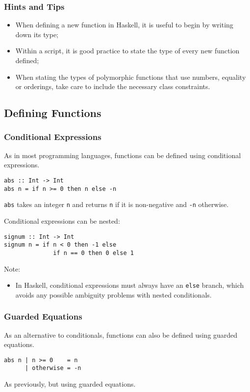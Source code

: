 \begin{multicols}{2}
\subsubsection{Hints and Tips}
\begin{itemize}
  \item When defining a new function in Haskell, it is useful to begin by writing down its type;
  \item Within a script, it is good practice to state the type of every new function defined;
  \item When stating the types of polymorphic functions that use numbers, equality or orderings, take care to include the necessary class constraints.
\end{itemize}

\subsection{Defining Functions}
\subsubsection{Conditional Expressions}
As in most programming languages, functions can be defined using conditional expressions.
\begin{lstlisting}
abs :: Int -> Int
abs n = if n >= 0 then n else -n
\end{lstlisting} %
\lstinline{abs} takes an integer \lstinline{n} and returns \lstinline{n} if it is non-negative and \lstinline{-n} otherwise.

Conditional expressions can be nested:
\begin{lstlisting}
signum :: Int -> Int
signum n = if n < 0 then -1 else
              if n == 0 then 0 else 1
\end{lstlisting}

Note:
\begin{itemize}
  \item In Haskell, conditional expressions must always have an \lstinline{else} branch, which avoids any possible ambiguity problems with nested conditionals.
\end{itemize}

\subsubsection{Guarded Equations}
As an alternative to conditionals, functions can also be defined using guarded equations.
\begin{lstlisting}
abs n | n >= 0    = n
      | otherwise = -n
\end{lstlisting}
As previously, but using guarded equations.


\end{multicols}
